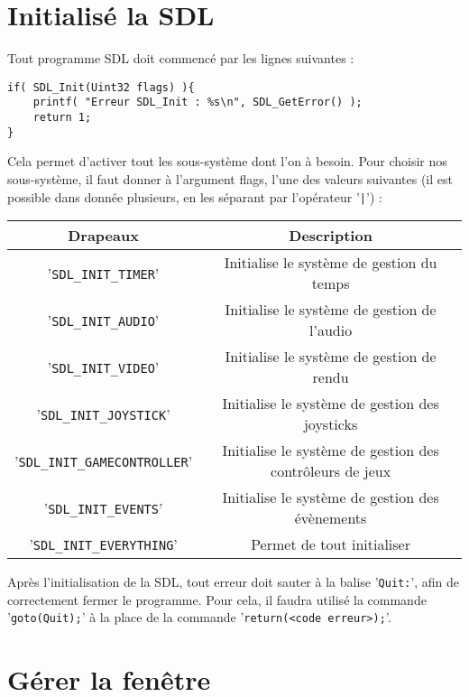 \documentclass[ 10pt , a4paper ]{Document}
\begin{document}
\begin{Document}
\section{Initialisé la SDL}
	Tout programme SDL doit commencé par les lignes suivantes :
\begin{lstlisting}[name="Initialiser"]
if( SDL_Init(Uint32 flags) ){
	printf( "Erreur SDL_Init : %s\n", SDL_GetError() );
	return 1;
}
\end{lstlisting}
	Cela permet d'activer tout les sous-système dont l'on à besoin.
	Pour choisir nos sous-système, il faut donner à l'argument flags, l'une des valeurs suivantes (il est possible dans donnée plusieurs, en les séparant par l'opérateur '\lstinline!|!') :\\
	\begin{tabular}{|c|c|}\hline
		Drapeaux & Description\\
		\hline\hline
		'\lstinline!SDL_INIT_TIMER!' & Initialise le système de gestion du temps\\
		\hline
		'\lstinline!SDL_INIT_AUDIO!' & Initialise le système de gestion de l’audio\\
		\hline
		'\lstinline!SDL_INIT_VIDEO!' & Initialise le système de gestion de rendu\\
		\hline
		'\lstinline!SDL_INIT_JOYSTICK!' & Initialise le système de gestion des joysticks\\
		\hline
		'\lstinline!SDL_INIT_GAMECONTROLLER!' & Initialise le système de gestion des contrôleurs de jeux\\
		\hline
		'\lstinline!SDL_INIT_EVENTS!' & Initialise le système de gestion des évènements\\
		\hline
		'\lstinline!SDL_INIT_EVERYTHING!' & Permet de tout initialiser\\
		\hline
	\end{tabular}
	Après l'initialisation de la SDL, tout erreur doit sauter à la balise '\lstinline!Quit:!', afin de correctement fermer le programme.
	Pour cela, il faudra utilisé la commande '\lstinline!goto(Quit);!'
	à la place de la commande '\lstinline!return(<code erreur>);!'.
\section{Gérer la fenêtre}

\end{Document}
\end{document}
